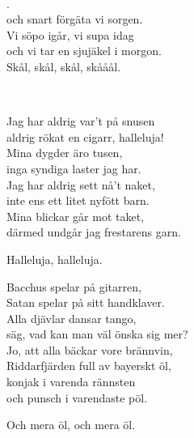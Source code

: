  \\ 
\author{Text: Torsten Hummel-Gumælius}

\leftrepeat {}.\\
och snart förgäta vi sorgen.\\
Vi söpo igår, vi supa idag\\
och vi tar en sjujäkel i morgon. \rightrepeat\\
Skål, skål, skål, skååål.\\

\newpage 


 \\       

\songtext{}
Jag har aldrig var't på snusen\\
aldrig rökat en cigarr, halleluja!\\
Mina dygder äro tusen,\\
inga syndiga laster jag har.\\
Jag har aldrig sett nå't naket,\\
inte ens ett litet nyfött barn.\\
Mina blickar går mot taket,\\
därmed undgår jag frestarens garn.

\leftrepeat Halleluja, halleluja. \rightrepeat

Bacchus spelar på gitarren,\\
Satan spelar på sitt handklaver.\\
Alla djävlar dansar tango,\\
säg, vad kan man väl önska sig mer?\\
Jo, att alla bäckar vore brännvin,\\
Riddarfjärden full av bayerskt öl,\\
konjak i varenda rännsten\\
och punsch i varendaste pöl.

\leftrepeat Och mera öl, och mera öl. \rightrepeat

\newpage


 \\       

